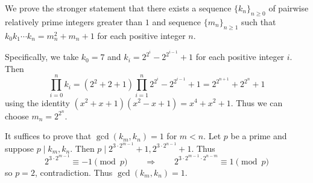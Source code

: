 We prove the stronger statement that there exists a sequence $\{k_n\}_{n\geq0}$ of pairwise relatively prime integers greater than $1$ and sequence $\{m_n\}_{n\geq1}$ such that $k_0k_1\cdots k_n=m_n^2+m_n+1$ for each positive integer $n$.

Specifically, we take $k_0=7$ and $k_i=2^{2^i}-2^{2^{i-1}}+1$ for each positive integer $i$. Then \[\displaystyle\prod_{i=0}^nk_i=(2^2+2+1)\displaystyle\prod_{i=1}^n2^{2^i}-2^{2^{i-1}}+1=2^{2^{n+1}}+2^{2^n}+1\] using the identity $(x^2+x+1)(x^2-x+1)=x^4+x^2+1$. Thus we can choose $m_n=2^{2^n}$.

It suffices to prove that $\gcd(k_m,k_n)=1$ for $m<n$. Let $p$ be a prime and suppose $p\mid k_m,k_n$. Then $p\mid 2^{3\cdot2^{m-1}}+1,2^{3\cdot2^{n-1}}+1$. Thus \[2^{3\cdot2^{m-1}}\equiv-1\pmod p\qquad\Longrightarrow\qquad2^{3\cdot2^{m-1}\cdot2^{n-m}}\equiv1\pmod p\] so $p=2$, contradiction. Thus $\gcd(k_m,k_n)=1$.